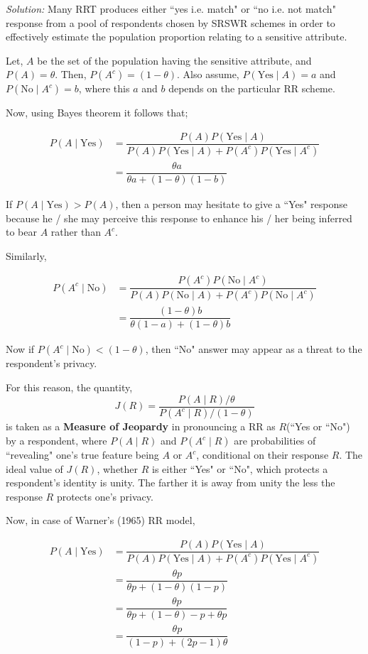 \documentclass[12pt]{article}
\theoremstyle{definition}
\newenvironment{answer}{\textit{Solution: }\quad }{ \hfill \qedsymbol}
\begin{document}
\begin{answer}
	Many RRT produces either ``yes i.e. match" or ``no i.e. not match" response from a pool of respondents chosen by SRSWR schemes in order to effectively estimate the population proportion relating to a sensitive attribute.
	
	Let, $A$ be the set of the population having the sensitive attribute, and $P(A) = \theta$. Then, $P(A^c) = (1 - \theta)$. Also assume, $P(\text{Yes} \mid A) = a$ and $P(\text{No} \mid A^c) = b$, where this $a$ and $b$ depends on the particular RR scheme.

	Now, using Bayes theorem it follows that;

	\begin{align*}
		P(A \mid \text{Yes}) 
		& = \dfrac{P(A) P(\text{Yes}\mid A) }{P(A) P(\text{Yes}\mid A) + P(A^c) P(\text{Yes}\mid A^c)}\\
		& = \dfrac{\theta a}{\theta a + (1-\theta) (1-b)}
	\end{align*}
	
	If $P(A \mid \text{Yes}) > P(A)$, then a person may hesitate to give a ``Yes" response because he / she may perceive this response to enhance his / her being inferred to bear $A$ rather than $A^c$.
	
	Similarly,
	
	\begin{align*}
		P(A^c \mid \text{No}) 
		& = \dfrac{P(A^c) P(\text{No}\mid A^c) }{P(A) P(\text{No}\mid A) + P(A^c) P(\text{No}\mid A^c)}\\
		& = \dfrac{(1 - \theta) b}{\theta (1-a) + (1-\theta) b}
	\end{align*}
	
	Now if $P(A^c \mid \text{No}) < (1-\theta)$, then ``No" answer may appear as a threat to the respondent's privacy.

	For this reason, the quantity,
    $$J(R) = \dfrac{P(A\mid R)/\theta}{P(A^c \mid R)/(1-\theta)}$$
    is taken as a \textbf{Measure of Jeopardy} in pronouncing a RR as $R$(``Yes or ``No") by a respondent, where $P(A\mid R)$ and $P(A^c\mid R)$ are probabilities of ``revealing" one's true feature being $A$ or $A^c$, conditional on their response $R$. The ideal value of $J(R)$, whether $R$ is either ``Yes" or ``No", which protects a respondent's identity is unity. The farther it is away from unity the less the response $R$ protects one's privacy.

	Now, in case of Warner's (1965) RR model, 

	\begin{align*}
		P(A \mid \text{Yes}) 
		& = \dfrac{P(A) P(\text{Yes}\mid A) }{ P(A) P(\text{Yes}\mid A) + P(A^c) P(\text{Yes}\mid A^c) }\\
		& = \dfrac{\theta p}{\theta p + (1-\theta) (1-p)}\\
		& = \dfrac{\theta p}{ \theta p + (1 - \theta) - p + \theta p }\\
		& = \dfrac{\theta p}{(1 - p) + (2p - 1)\theta}
	\end{align*}
	

\end{answer}
\end{document}
